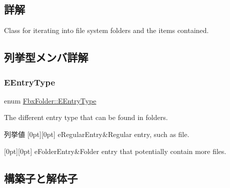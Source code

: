 \subsection{詳解}
Class for iterating into file system folders and the items contained. 

\subsection{列挙型メンバ詳解}
\mbox{\label{class_fbx_folder_aba9ef5b806b138dec254dfe5dedbb719}} 
\subsubsection{\texorpdfstring{E\+Entry\+Type}{EEntryType}}
{\footnotesize\ttfamily enum \hyperlink{class_fbx_folder_aba9ef5b806b138dec254dfe5dedbb719}{Fbx\+Folder\+::\+E\+Entry\+Type}}



The different entry type that can be found in folders. 

\begin{DoxyEnumFields}{列挙値}
[0pt][0pt]{}\mbox{\label{class_fbx_folder_aba9ef5b806b138dec254dfe5dedbb719a5e6793b9289c6aecd4cf50a6e19bbee5}} 
e\+Regular\+Entry&Regular entry, such as file. \\
\hline

[0pt][0pt]{}\mbox{\label{class_fbx_folder_aba9ef5b806b138dec254dfe5dedbb719a1a78e903f59673df49ba233185e186c9}} 
e\+Folder\+Entry&Folder entry that potentially contain more files. \\
\hline

\end{DoxyEnumFields}


\subsection{構築子と解体子}
\mbox{\label{class_fbx_folder_aa62f568592036dc48a8d74b212da117c}} 
